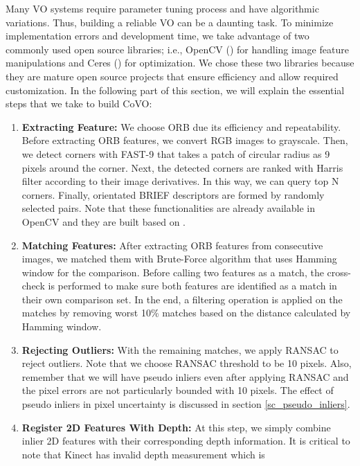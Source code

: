\documentclass[a4paper]{report}
\numberwithin{figure}{section}
\begin{document}
Many VO systems require parameter tuning process and have algorithmic
variations.  Thus, building a reliable VO can be a daunting task.  To minimize
implementation errors and development time, we take advantage of two commonly
used open source libraries; i.e., OpenCV (\parencite{opencv}) for handling 
image
feature manipulations and Ceres (\parencite{ceres-solver}) for optimization. We
chose these two libraries because they are mature open source projects that
ensure efficiency and allow required customization.  In the following part of
this section, we will explain the essential steps that we take to build CoVO:


\begin{enumerate} 
  \item \textbf{Extracting Feature:} We choose ORB due its efficiency and
    repeatability. Before extracting ORB features, we convert RGB images to
    grayscale. Then, we detect corners with FAST-9 that takes a patch of
    circular radius as 9 pixels around the corner. Next, the detected corners
    are ranked with Harris filter according to their image derivatives. In this
    way, we can query top N corners.  Finally, orientated BRIEF descriptors are
    formed by randomly selected pairs.  Note that these functionalities are
    already available in OpenCV and they are built based on 
    \parencite{Rublee2011a}.  
  \item \textbf{Matching Features:} After extracting ORB features from
    consecutive images, we matched them with Brute-Force algorithm that uses
    Hamming window for the comparison. Before calling two features as a match,
    the cross-check is performed to make sure both features are identified as a
    match in their own comparison set.  In the end, a filtering operation is
    applied on the matches by removing worst 10\% matches based on the distance
    calculated by Hamming window.
  \item \textbf{Rejecting Outliers:} With the remaining matches, we apply
    RANSAC to reject outliers. Note that we choose RANSAC threshold to be 10
    pixels. Also, remember that we will have pseudo inliers even after applying
    RANSAC and the pixel errors are not particularly bounded with 10 pixels.
    The effect of pseudo inliers in pixel uncertainty is discussed in section
    \ref{sc_pseudo_inliers}.
  \item \textbf{Register 2D Features With Depth:} At this step, we simply
    combine inlier 2D features with their corresponding depth information. It
    is critical to note that Kinect has invalid depth measurement which is

\end{enumerate}
\end{document}
